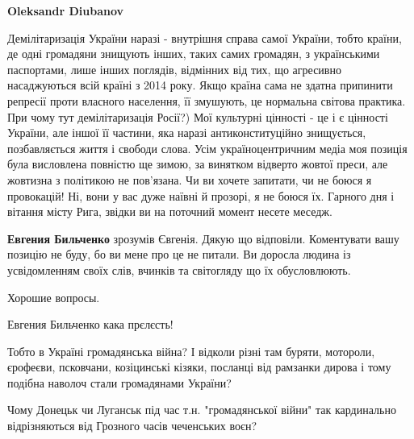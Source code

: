 \begin{itemize}
\begin{itemize}
\textbf{Oleksandr Diubanov} 

Демілітаризація України наразі - внутрішня справа
самої України, тобто країни, де одні громадяни знищують інших, таких самих
громадян, з українськими паспортами, лише інших поглядів, відмінних від тих, що
агресивно насаджуються всій країні з 2014 року. Якщо країна сама не здатна
припинити репресії проти власного населення, її змушують, це нормальна світова
практика. При чому тут демілітаризація Росії?) Мої культурні цінності - це і є
цінності України, але іншої її частини, яка наразі антиконституційно
знищується, позбавляється життя і свободи слова. Усім україноцентричним медіа
моя позиція була висловлена повністю ще зимою, за винятком відверто жовтої
преси, але жовтизна з політикою не пов'язана. Чи ви хочете запитати, чи не
боюся я провокацій! Ні, вони у вас дуже наївні й прозорі, я не боюся їх.
Гарного дня і вітання місту Рига, звідки ви на поточний момент несете меседж.


 
\textbf{Евгения Бильченко} зрозумів Євгенія. Дякую що відповіли. Коментувати
вашу позицію не буду, бо ви мене про це не питали. Ви доросла людина із
усвідомленням своїх слів, вчинків та світогляду що їх обусловлюють.

 
Хорошие вопросы.

 

Евгения Бильченко кака прєлєсть!

Тобто в Україні громадянська війна? І відколи різні там буряти, мотороли,
єрофеєви, псковчани, козіцинські кізяки, посланці від рамзанки дирова і тому
подібна наволоч стали громадянами України?

Чому Донецьк чи Луганськ під час т.н. "громадянської війни" так кардинально
відрізняються від Грозного часів чеченських воєн?


\end{itemize}
\end{itemize}
